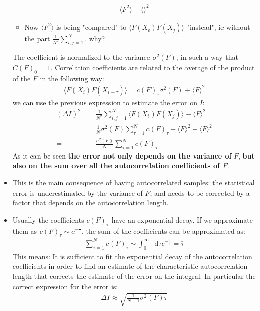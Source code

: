 \documentclass[twoside,english]{uiofysmaster}
\newcommand*\dif{\mathop{}\!\mathrm{d}}
\begin{document}
\begin{itemize}
\begin{align}
		{ \langle F^2 \rangle - \langle  \rangle^2 }
	\end{align}
	\begin{itemize}
		\item Now $ \langle F^2 \rangle$ is being "compared" to  $\langle F(X_i) F(X_j) \rangle $ "instead", ie without the part $\frac{1}{N^2} \sum_{i,j=1}^N $. why?	
	\end{itemize}
	The coefficient is normalized to the variance $\sigma^2 (F)$, in such a way that $C(F)_0 = 1$.
	Correlation coefficients are related to the average of the product of the $F$ in the following way:
	\begin{align}
		\langle F(X_i) F(X_{i+\tau}) \rangle = c(F)_\tau \sigma^2 (F) + \langle F \rangle^2
	\end{align}
	we can use the previous expression to estimate the error on $I$:
	\begin{align}
		(\Delta I)^2 =& \frac{1}{N^2} \sum_{i,j=1}^N \langle F(X_i) F(X_j) \rangle - \langle F \rangle^2 \\
		=& \frac{1}{N} \sigma^2 (F) \sum_{\tau=1}^N c(F)_\tau + \langle F \rangle^2 - \langle F \rangle^2 \\
		=& \frac{\sigma^2 (F)}{N} \sum_{\tau=1}^N c(F)_\tau
	\end{align}
	As it can be seen \textbf{the error not only depends on the variance of} $F$, \textbf{but also on the sum over all the autocorrelation coefficients of} $F$. 
	\item This is the main consequence of having autocorrelated samples: the statistical error is underestimated by the variance of $F$, and needs to be corrected by a factor that depends on the autocorrelation length. 
	\item Usually the coefficients $c(F)_\tau$ have an exponential decay. If we approximate them as $c(F)_\tau \sim e^{-\frac{\tau}{\bar{\tau}}}$, the sum of the coefficients can be approximated as:
	\begin{align}
		\sum_{\tau=1}^N c(F)_\tau \sim \int_0^\infty \dif \tau e^{-\frac{\tau}{\bar{\tau}}} = \bar{\tau}
	\end{align}
	This means: It is sufficient to fit the exponential decay of the autocorrelation coefficients in order to find an estimate of the characteristic autocorrelation length that corrects the estimate of the error on the integral. In particular the correct expression for the error is:
	\begin{align}
		\Delta I \approx \sqrt{ \frac{1}{N-1} \sigma^2 (F) \bar{\tau} }
	\end{align}

\end{itemize}
\end{document}

